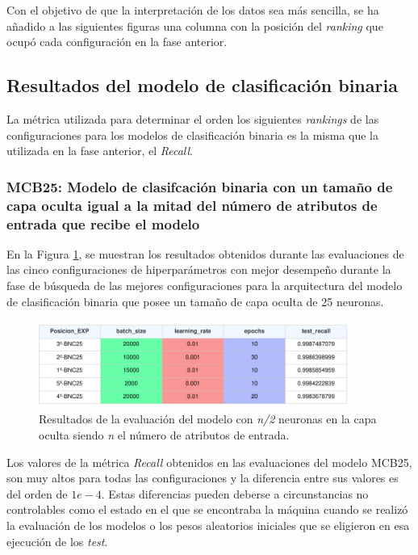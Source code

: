 Con el objetivo de que la interpretación de los datos sea más sencilla, se ha añadido a las siguientes figuras una columna con la posición del \textit{ranking} que ocupó cada configuración en la fase anterior.

\subsection{Resultados del modelo de clasificación binaria}
La métrica utilizada para determinar el orden los siguientes \textit{rankings} de las configuraciones para los modelos de clasificación binaria es la misma que la utilizada en la fase anterior, el \textit{Recall}.

\subsubsection{MCB25: Modelo de clasifcación binaria con un tamaño de capa oculta igual a la mitad del número de atributos de entrada que recibe el modelo}
En la Figura \ref{fig:EVALMCB25}, se muestran los resultados obtenidos durante las evaluaciones de las cinco configuraciones de hiperparámetros con mejor desempeño durante la fase de búsqueda de las mejores configuraciones para la arquitectura del modelo de clasificación binaria que posee un tamaño de capa oculta de 25 neuronas.

\begin{figure}[H]
    \centering
    \includegraphics[width=0.9\textwidth]{./img/evaluacion/EVALMCB25.pdf}
    \caption{Resultados de la evaluación del modelo con \textit{n/2} neuronas en la capa oculta siendo \textit{n} el número de atributos de entrada.}
    \label{fig:EVALMCB25}
\end{figure}

Los valores de la métrica \textit{Recall} obtenidos en las evaluaciones del modelo MCB25, son muy altos para todas las configuraciones y la diferencia entre sus valores es del orden de $1e-4$. Estas diferencias pueden deberse a circunstancias no controlables como el estado en el que se encontraba la máquina cuando se realizó la evaluación de los modelos o los pesos aleatorios iniciales que se eligieron en esa ejecución de los \textit{test}.


